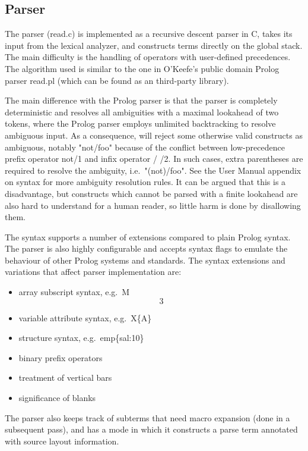 \subsection{Parser}

The parser (read.c) is implemented as a recursive descent parser in C,
takes its input from the lexical analyzer, and constructs {\eclipse}
terms directly on the global stack.  The main difficulty is the
handling of operators with user-defined precedences.  The algorithm
used is similar to the one in O'Keefe's public domain Prolog parser
read.pl (which can be found as an {\eclipse} third-party library).

The main difference with the Prolog parser is that the {\eclipse}
parser is completely deterministic and resolves all ambiguities with a
maximal lookahead of two tokens, where the Prolog parser employs
unlimited backtracking to resolve ambiguous input.  As a consequence,
{\eclipse} will reject some otherwise valid constructs as ambiguous,
notably "not/foo" because of the conflict between low-precedence
prefix operator not/1 and infix operator / /2.  In such cases, extra
parentheses are required to resolve the ambiguity, i.e.\ "(not)/foo". 
See the User Manual appendix on syntax for more ambiguity resolution
rules.  It can be argued that this is a disadvantage, but constructs
which cannot be parsed with a finite lookahead are also hard to
understand for a human reader, so little harm is done by disallowing
them.

The {\eclipse} syntax supports a number of extensions compared to plain
Prolog syntax. The parser is also highly configurable and accepts syntax
flags to emulate the behaviour of other Prolog systems and standards.
The syntax extensions and variations that affect parser implementation are:
\begin{itemize}
\item array subscript syntax, e.g.\ M\[3\]
\item variable attribute syntax, e.g.\ X\{A\}
\item structure syntax, e.g.\ emp\{sal:10\}
\item binary prefix operators
\item treatment of vertical bars
\item significance of blanks
\end{itemize}

The parser also keeps track of subterms that need macro expansion
(done in a subsequent pass), and has a mode in which it constructs
a parse term annotated with source layout information.


